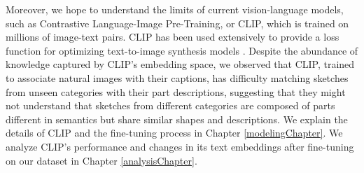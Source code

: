 Moreover, we hope to understand the limits of current vision-language models, such as Contrastive Language-Image Pre-Training, or CLIP, which is trained on millions of image-text pairs. CLIP has been used extensively to provide a loss function for optimizing text-to-image synthesis models \citep{clipDrawPaper,dalle2Paper,styleganNadaPaper,styleCLIPPaper}. Despite the abundance of knowledge captured by CLIP's embedding space, we observed that CLIP, trained to associate natural images with their captions, has difficulty matching sketches from unseen categories with their part descriptions, suggesting that they might not understand that sketches from different categories are composed of parts different in semantics but share similar shapes and descriptions. We explain the details of CLIP and the fine-tuning process in Chapter \ref{modelingChapter}. We analyze CLIP's performance and changes in its text embeddings after fine-tuning on our dataset in Chapter \ref{analysisChapter}. 


